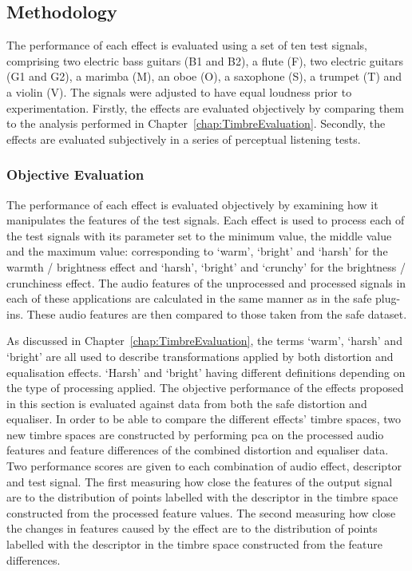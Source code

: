 	\subsection{Methodology}
	\label{sec:PerceptualExperiments-SemanticControl-Methodology}
		The performance of each effect is evaluated using a set of ten test signals, comprising two electric bass
		guitars (B1 and B2), a flute (F), two electric guitars (G1 and G2), a marimba (M), an oboe (O), a saxophone
		(S), a trumpet (T) and a violin (V). The signals were adjusted to have equal loudness prior to
		experimentation.  Firstly, the effects are evaluated objectively by comparing them to the analysis
		performed in Chapter~\ref{chap:TimbreEvaluation}. Secondly, the effects are evaluated subjectively in a
		series of perceptual listening tests.

		\subsubsection*{Objective Evaluation}
			The performance of each effect is evaluated objectively by examining how it manipulates the
			features of the test signals. Each effect is used to process each of the test signals with its
			parameter set to the minimum value, the middle value and the maximum value: corresponding to
			`warm', `bright' and `harsh' for the warmth / brightness effect and `harsh', `bright' and `crunchy'
			for the brightness / crunchiness effect. The audio features of the unprocessed and processed
			signals in each of these applications are calculated in the same manner as in the \acrshort{safe}
			plug-ins.  These audio features are then compared to those taken from the \acrshort{safe} dataset.

			As discussed in Chapter~\ref{chap:TimbreEvaluation}, the terms `warm', `harsh' and `bright' are all
			used to describe transformations applied by both distortion and equalisation effects. `Harsh' and
			`bright' having different definitions depending on the type of processing applied. The objective
			performance of the effects proposed in this section is evaluated against data from both the
			\acrshort{safe} distortion and equaliser. In order to be able to compare the different effects'
			timbre spaces, two new timbre spaces are constructed by performing \acrshort{pca} on the processed
			audio features and feature differences of the combined distortion and equaliser data. Two
			performance scores are given to each combination of audio effect, descriptor and test signal. The
			first measuring how close the features of the output signal are to the distribution of points
			labelled with the descriptor in the timbre space constructed from the processed feature values. The
			second measuring how close the changes in features caused by the effect are to the distribution of
			points labelled with the descriptor in the timbre space constructed from the feature differences.

